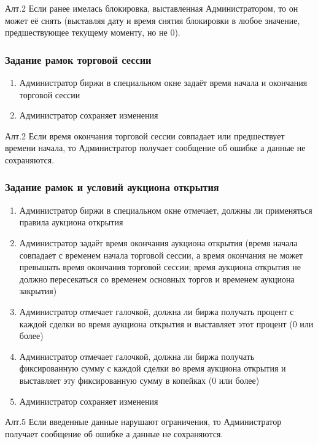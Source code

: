 \documentclass[a4paper, 12pt]{article}        %
\begin{document}
Алт.2 Если ранее имелась блокировка, выставленная Администратором, то он может её снять (выставляя дату и время снятия блокировки в любое значение, предшествующее текущему моменту, но не 0).

\subsubsection{Задание рамок торговой сессии}

\begin{enumerate}
\item Администратор биржи в специальном окне задаёт время начала и окончания торговой сессии
\item Администратор сохраняет изменения
\end{enumerate}

Алт.2 Если время окончания торговой сессии совпадает или предшествует времени начала, то Администратор получает сообщение об ошибке а данные не сохраняются.

\subsubsection{Задание рамок и условий аукциона открытия}

\begin{enumerate}
\item Администратор биржи в специальном окне отмечает, должны ли применяться правила аукциона открытия
\item Администратор задаёт время окончания аукциона открытия (время начала совпадает с временем начала торговой сессии, а время окончания не может превышать время окончания торговой сессии; время аукциона открытия не должно пересекаться со временем основных торгов и временем аукциона закрытия)
\item Администратор отмечает галочкой, должна ли биржа получать процент с каждой сделки во время аукциона открытия и выставляет этот процент (0 или более)
\item Администратор отмечает галочкой, должна ли биржа получать фиксированную сумму с каждой сделки во время аукциона открытия и выставляет эту фиксированную сумму в копейках (0 или более)
\item Администратор сохраняет изменения
\end{enumerate}

Алт.5 Если введенные данные нарушают ограничения, то Администратор получает сообщение об ошибке а данные не сохраняются.
\end{document}
